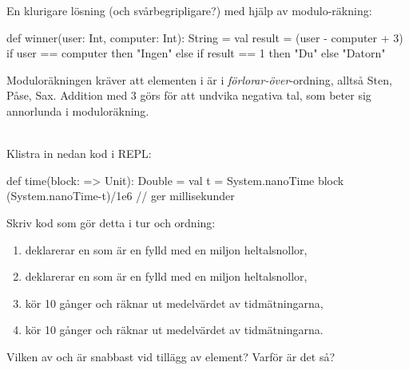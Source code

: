 En klurigare lösning (och svårbegripligare?) med hjälp av modulo-räkning:

\begin{Code}
def winner(user: Int, computer: Int): String = 
  val result = (user - computer + 3) %
  if user == computer then "Ingen"
  else if result == 1 then "Du"
  else "Datorn"
\end{Code}
Moduloräkningen kräver att elementen i  är i \emph{förlorar-över}-ordning, alltså Sten, Påse, Sax. Addition med 3 görs för att undvika negativa tal, som beter sig annorlunda i moduloräkning.

\QUESTEND




\QUESTBEGIN

\Task\Uberkurs \what~\\
Klistra in nedan kod i REPL:
\begin{Code}
def time(block: => Unit): Double =
  val t = System.nanoTime
  block
  (System.nanoTime-t)/1e6  // ger millisekunder
\end{Code}

\Subtask Skriv kod som gör detta i tur och ordning:
\begin{enumerate}
  \item deklarerar en  som är en  fylld med en miljon heltalsnollor,
  \item deklarerar en  som är en  fylld med en miljon heltalsnollor,
  \item kör  10 gånger och räknar ut medelvärdet av tidmätningarna,
  \item kör  10 gånger och räknar ut medelvärdet av tidmätningarna.
\end{enumerate}

\Subtask Vilken av  och  är snabbast vid tillägg av element? Varför är det så?

\SOLUTION

\TaskSolved \what~

